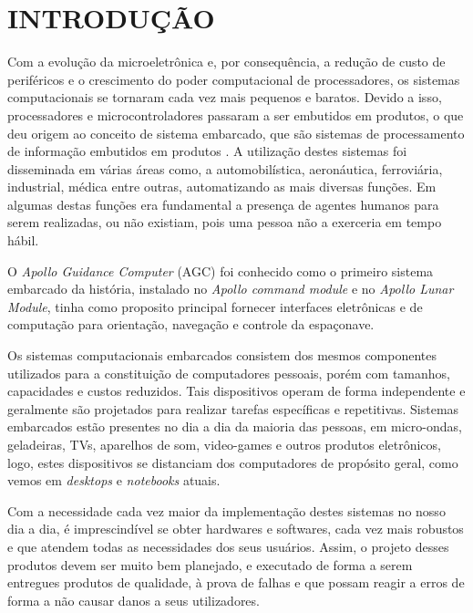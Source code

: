
\chapter{INTRODUÇÃO}
\label{chap:introducao}
Com a evolução da microeletrônica e, por consequência, a redução de custo de periféricos e o crescimento do poder computacional de processadores, os sistemas computacionais se tornaram cada vez mais pequenos e baratos. Devido a isso, processadores e microcontroladores passaram a ser embutidos em produtos, o que deu origem ao conceito de sistema embarcado, que são sistemas de processamento de informação embutidos em produtos \cite{Marwedel2006}.
A utilização destes sistemas foi disseminada em várias áreas como, a automobilística, aeronáutica, ferroviária, industrial, médica entre outras, automatizando as mais diversas funções. Em algumas destas funções era fundamental a presença de agentes humanos para serem realizadas, ou não existiam, pois uma pessoa não a exerceria em tempo hábil.

O \textit{Apollo Guidance Computer} (AGC) foi conhecido como o primeiro sistema embarcado da história, instalado no \textit{Apollo command module} e no \textit{Apollo Lunar Module}, tinha como proposito principal fornecer interfaces eletrônicas e de computação para orientação, navegação e controle da espaçonave.


Os sistemas computacionais embarcados consistem dos mesmos componentes utilizados para a constituição de computadores pessoais, porém com tamanhos, capacidades e custos reduzidos. Tais dispositivos operam de forma independente e geralmente são projetados para realizar tarefas específicas e repetitivas. 
Sistemas embarcados estão presentes no dia a dia da maioria das pessoas, em micro-ondas, geladeiras, TVs, aparelhos de som, video-games e outros produtos eletrônicos\cite{Marwedel2006}, logo, estes dispositivos se distanciam dos computadores de propósito geral, como vemos em \textit{desktops} e \textit{notebooks} atuais. 




Com a necessidade cada vez maior da implementação destes sistemas no nosso dia a dia, é imprescindível se obter hardwares e softwares, cada vez mais robustos e que atendem todas as necessidades dos seus usuários.
Assim, o projeto desses produtos devem ser muito bem planejado, e executado de forma a serem entregues produtos de qualidade, à  prova de falhas e que possam reagir a erros de forma a não causar danos a seus utilizadores. 

